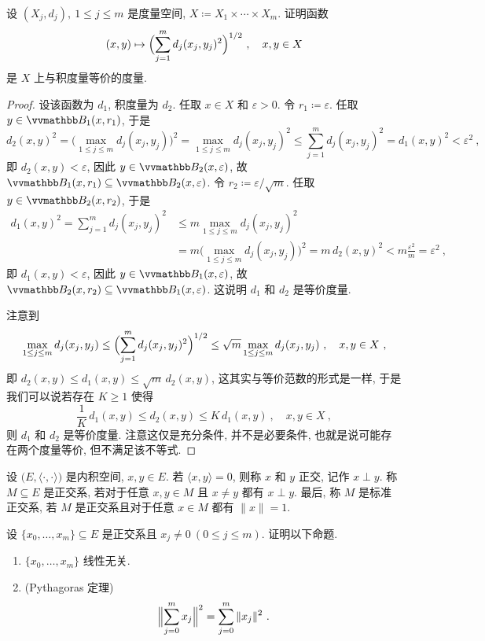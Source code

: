 \begin{exercise}
    设 \((X_j, d_j),\ 1 \leq j \leq m\) 是度量空间, \(X \coloneqq X_1 \times \cdots \times X_m\). 证明函数
    \[
        (x, y) \mapsto \Bigl(\sum_{j = 1}^m d_j(x_j, y_j)^2\Bigr)^{1 / 2}\ ,\quad x, y \in X
    \]
    是 \(X\) 上与积度量等价的度量.
\end{exercise}

\begin{proof}
    设该函数为 \(d_1\), 积度量为 \(d_2\). 任取 \(x \in X\) 和 \(\varepsilon > 0\). 令 \(r_1 \coloneqq \varepsilon\). 任取 \(y \in \B_1(x, r_1)\), 于是
    \[
        d_2(x, y)^2 = \bigl(\max_{1 \leq j \leq m} d_j(x_j, y_j)\bigr)^2 = \max_{1 \leq j \leq m} d_j(x_j, y_j)^2 \leq \sum_{j = 1}^m d_j(x_j, y_j)^2 = d_1(x, y)^2 < \varepsilon^2\ ,
    \]
    即 \(d_2(x, y) < \varepsilon\), 因此 \(y \in \B_2(x, \varepsilon)\), 故 \(\B_1(x, r_1) \subseteq \B_2(x, \varepsilon)\). 令 \(r_2 \coloneqq \varepsilon / \sqrt{m}\). 任取 \(y \in \B_2(x, r_2)\), 于是
    \begin{align*}
        d_1(x, y)^2 = \sum_{j = 1}^m d_j(x_j, y_j)^2 &\leq m \max_{1 \leq j \leq m} d_j(x_j, y_j)^2 \\
        &= m \bigl(\max_{1 \leq j \leq m} d_j(x_j, y_j)\bigr)^2 = m\, d_2(x, y)^2 < m \frac{\varepsilon^2}{m} = \varepsilon^2\ ,
    \end{align*}
    即 \(d_1(x, y) < \varepsilon\), 因此 \(y \in \B_1(x, \varepsilon)\), 故 \(\B_2(x, r_2) \subseteq \B_1(x, \varepsilon)\). 这说明 \(d_1\) 和 \(d_2\) 是等价度量.

    注意到
    \[
        \max_{1 \leq j \leq m} d_j(x_j, y_j) \leq \Bigl(\sum_{j = 1}^m d_j(x_j, y_j)^2\Bigr)^{1 / 2} \leq \sqrt{m} \max_{1 \leq j \leq m} d_j(x_j, y_j)\ ,\quad x, y \in X\ ,
    \]
    即 \(d_2(x, y) \leq d_1(x, y) \leq \sqrt{m}\, d_2(x, y)\), 这其实与等价范数的形式是一样, 于是我们可以说若存在 \(K \geq 1\) 使得
    \[
        \frac{1}{K}\, d_1(x, y) \leq d_2(x, y) \leq K\, d_1(x, y)\ ,\quad x, y \in X\ ,
    \]
    则 \(d_1\) 和 \(d_2\) 是等价度量. 注意这仅是充分条件, 并不是必要条件, 也就是说可能存在两个度量等价, 但不满足该不等式.
\end{proof}

\begin{exercise}\label{ex:orthogonal-in-inner-product-spaces}
    设 \(\bigl(E, \langle \cdot, \cdot \rangle\bigr)\) 是内积空间, \(x, y \in E\). 若 \(\langle x, y \rangle = 0\), 则称 \(x\) 和 \(y\) 正交, 记作 \(x \perp y\). 称 \(M \subseteq E\) 是正交系, 若对于任意 \(x, y \in M\) 且 \(x \neq y\) 都有 \(x \perp y\). 最后, 称 \(M\) 是标准正交系, 若 \(M\) 是正交系且对于任意 \(x \in M\) 都有 \(\|x\| = 1\).

    设 \(\{x_0, \ldots, x_m\} \subseteq E\) 是正交系且 \(x_j \neq 0\ (0 \leq j \leq m)\). 证明以下命题.
    \begin{enumerate}
        \item \(\{x_0, \ldots, x_m\}\) 线性无关.
        \item (Pythagoras 定理)
        \[
            \Bigl\|\sum_{j = 0}^m x_j\Bigr\|^2 = \sum_{j = 0}^m \|x_j\|^2\ .
        \]
    \end{enumerate}
\end{exercise}

